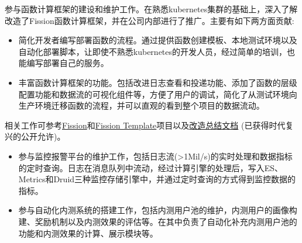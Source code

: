 \documentclass{resume}
\begin{document}
    参与函数计算框架的建设和维护工作。在熟悉kubernetes集群的基础上，深入了解改造了Fission函数计算框架，并在公司内部进行了推广。主要有如下两方面贡献:
  \begin{itemize}[topsep = 0 pt, partopsep = 0pt]
    \item 简化开发者编写部署函数的流程。通过提供函数创建模板、本地测试环境以及自动化部署脚本，让即使不熟悉kubernetes的开发人员，经过简单的培训，也能编写部署自己的服务。
    \item 丰富函数计算框架的功能。包括改进日志查看和投递功能、添加了函数的层级配置功能和数据流的可视化组件等，方便了用户的调试，简化了从测试环境向生产环境迁移函数的流程，并可以直观的看到整个项目的数据流动。
  \end{itemize}
    相关工作可参考\href{https://github.com/jingtaozhang18/fission}{Fission}和\href{https://github.com/jingtaozhang18/fission-template}{Fission Template}项目以及\href{https://jingtao.fun/%E6%BA%90%E7%A0%81-Fission%E5%8A%9F%E8%83%BD%E6%8B%93%E5%B1%95/}{改造总结文档} (已获得时代复兴的公开允许)。
  
  \begin{itemize}[topsep = 0 pt, partopsep = 0pt]
    \item 参与监控报警平台的维护工作，包括日志流(>1Mil/s)的实时处理和数据指标的定时查询。日志在消息队列中流动，经过计算引擎的处理后，写入ES、Metrics和Druid三种监控存储引擎中，并通过定时查询的方式得到监控数据的指标。
    \item 参与自动化内测系统的搭建工作，包括内测用户池的维护，内测用户的画像构建、奖励机制以及内测效果的评估等。在其中负责了自动化补充内测用户池的功能和内测效果的计算、展示模块等。
  \end{itemize}
  
\end{document}

